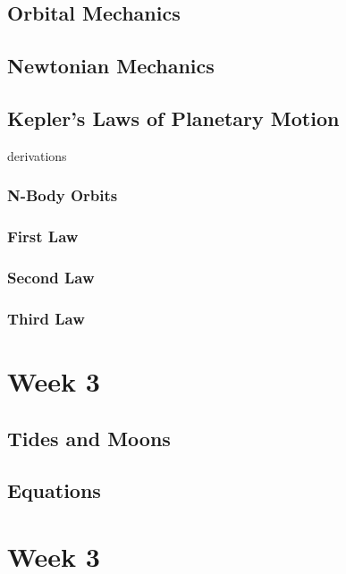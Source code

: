 \documentclass[a4paper,10pt]{article}
\begin{document}
\subsection{Orbital Mechanics}

\subsection{Newtonian Mechanics}

\subsection{Kepler's Laws of Planetary Motion}
derivations
\subsubsection{N-Body Orbits}
\subsubsection{First Law}
\subsubsection{Second Law}
\subsubsection{Third Law}


\newpage
\section{Week 3}

\subsection{Tides and Moons}

\subsection{Equations}


\newpage
\section{Week 3}
\end{document}
